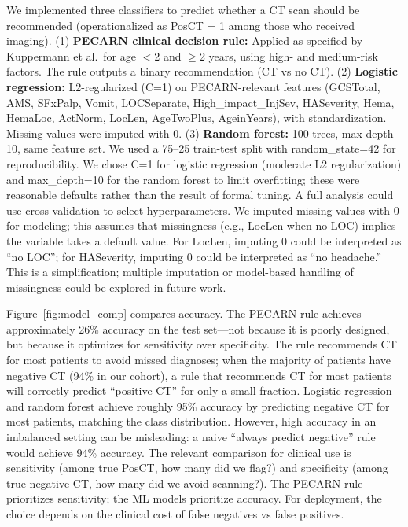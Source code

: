 \documentclass[12ptpt,letterpaper]{article}
\begin{document}
We implemented three classifiers to predict whether a CT scan should be recommended (operationalized as PosCT = 1 among those who received imaging). (1) \textbf{PECARN clinical decision rule:} Applied as specified by Kuppermann et al.\ for age $<$2 and $\ge$2 years, using high- and medium-risk factors. The rule outputs a binary recommendation (CT vs no CT). (2) \textbf{Logistic regression:} L2-regularized (C=1) on PECARN-relevant features (GCSTotal, AMS, SFxPalp, Vomit, LOCSeparate, High\_impact\_InjSev, HASeverity, Hema, HemaLoc, ActNorm, LocLen, AgeTwoPlus, AgeinYears), with standardization. Missing values were imputed with 0. (3) \textbf{Random forest:} 100 trees, max depth 10, same feature set. We used a 75--25 train-test split with random\_state=42 for reproducibility. We chose C=1 for logistic regression (moderate L2 regularization) and max\_depth=10 for the random forest to limit overfitting; these were reasonable defaults rather than the result of formal tuning. A full analysis could use cross-validation to select hyperparameters. We imputed missing values with 0 for modeling; this assumes that missingness (e.g., LocLen when no LOC) implies the variable takes a default value. For LocLen, imputing 0 could be interpreted as ``no LOC''; for HASeverity, imputing 0 could be interpreted as ``no headache.'' This is a simplification; multiple imputation or model-based handling of missingness could be explored in future work.

Figure~\ref{fig:model_comp} compares accuracy. The PECARN rule achieves approximately 26\% accuracy on the test set---not because it is poorly designed, but because it optimizes for sensitivity over specificity. The rule recommends CT for most patients to avoid missed diagnoses; when the majority of patients have negative CT (94\% in our cohort), a rule that recommends CT for most patients will correctly predict ``positive CT'' for only a small fraction. Logistic regression and random forest achieve roughly 95\% accuracy by predicting negative CT for most patients, matching the class distribution. However, high accuracy in an imbalanced setting can be misleading: a naive ``always predict negative'' rule would achieve 94\% accuracy. The relevant comparison for clinical use is sensitivity (among true PosCT, how many did we flag?) and specificity (among true negative CT, how many did we avoid scanning?). The PECARN rule prioritizes sensitivity; the ML models prioritize accuracy. For deployment, the choice depends on the clinical cost of false negatives vs false positives.
\end{document}
